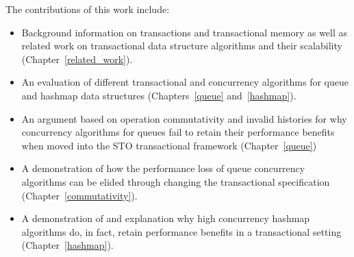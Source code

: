 The contributions of this work include: 
\begin{itemize}
    \item Background information on transactions and transactional memory as well as related work on transactional data structure algorithms and their scalability (Chapter~\ref{related_work}).
    \item An evaluation of different transactional and concurrency algorithms for queue and hashmap data structures (Chapters~\ref{queue} and~\ref{hashmap}).
    \item An argument based on operation commutativity and invalid histories for why concurrency algorithms for queues fail to retain their performance benefits when moved into the STO transactional framework (Chapter~\ref{queue})
    \item A demonstration of how the performance loss of queue concurrency algorithms can be elided through changing the transactional specification (Chapter~\ref{commutativity}).
    \item A demonstration of and explanation why high concurrency hashmap algorithms do, in fact, retain performance benefits in a transactional setting (Chapter~\ref{hashmap}).
\end{itemize}
